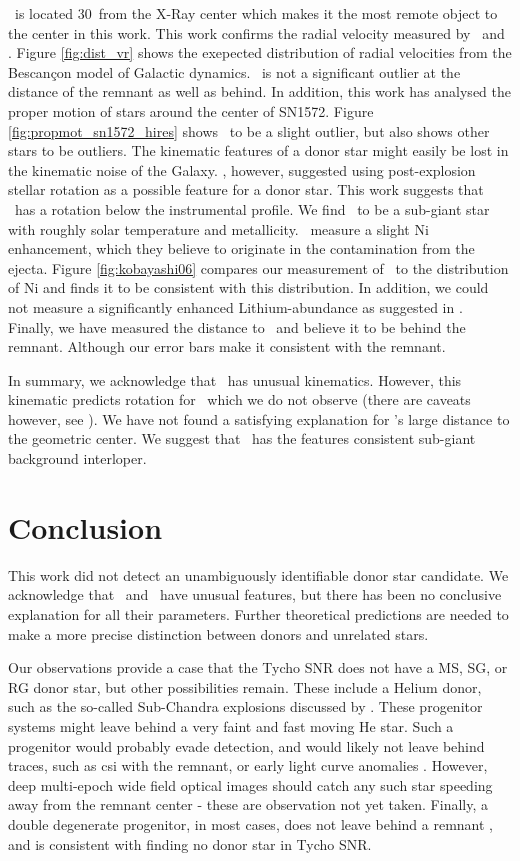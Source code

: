 \starg\ is located 30\arcsec\ from the X-Ray center which makes it the most remote object to the center in this work. This work confirms the radial velocity measured by \gh\ and \wek. Figure \ref{fig:dist_vr} shows the exepected distribution of radial velocities from the Bescan\c{c}on model of Galactic dynamics. \starg\ is not a significant outlier at the distance of the remnant as well as behind. 
In addition, this work has analysed the proper motion of stars around the center of SN1572. Figure \ref{fig:propmot_sn1572_hires} shows \starg\ to be a slight outlier, but also shows other stars to be outliers.
The kinematic features of a donor star might easily be lost in the kinematic noise of the Galaxy. \wek, however, suggested using post-explosion stellar rotation as a possible feature for a donor star. This work suggests that \starg\ has a rotation below the instrumental profile. 
We find \starg\ to be a sub-giant star with roughly solar temperature and metallicity.
\gh\ measure a slight Ni enhancement, which they believe to originate in the contamination from the ejecta. Figure \ref{fig:kobayashi06} compares our measurement of \starg\ to the distribution of Ni and finds it to be consistent with this distribution. In addition, we could not measure a significantly enhanced Lithium-abundance as suggested in \gh. 
Finally, we have measured the distance to \starg\ and believe it to be behind the remnant. Although our error bars make it consistent with the remnant.

In summary, we acknowledge that \starg\ has unusual kinematics. However, this kinematic predicts rotation for \starg\ which we do not observe (there are caveats however, see \wek). We have not  found a satisfying explanation for \starg's large distance to the geometric center. We suggest that \starg\, has the features consistent sub-giant background interloper.

\section{Conclusion}
\label{sec:sn1572_hires:conclusion}
This work did not detect an unambiguously identifiable donor star candidate. We acknowledge that \starb\ and \starg\ have unusual features, but there has been no conclusive explanation for all their parameters. Further theoretical predictions are needed to make a more precise distinction between donors and unrelated stars. 
 
Our observations provide a case that the Tycho SNR does not have a MS, SG, or RG donor star, but other possibilities remain. These include a Helium donor, such as the so-called Sub-Chandra explosions discussed by \cite{1995ApJ...452...62L, 2010ApJ...714L..52S}. These progenitor systems might leave behind a very faint and fast moving He star. Such a progenitor would probably evade detection, and would likely not leave behind traces, such as \gls{csi} with the remnant, or early light curve anomalies \citep{2010ApJ...708.1025K}. However, deep multi-epoch wide field optical images should catch any such star speeding away from the remnant center - these are observation not yet taken.
 Finally, a double degenerate progenitor, in most cases, does not leave behind a remnant , and is consistent with finding no donor star in Tycho SNR. 
 
